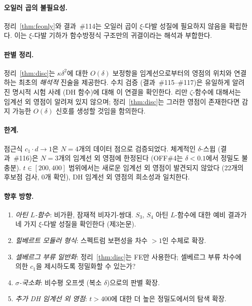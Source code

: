 \documentclass[11pt, a4paper]{article}
\theoremstyle{plain}
\theoremstyle{definition}
\begin{document}
\paragraph{오일러 곱의 불필요성.}
정리~\ref{thm:feonly}와 결과~\#114는 오일러 곱이
$\xi$-다발 성질에 필요하지 않음을 확립한다.
이는 $\xi$-다발 기하가 함수방정식 구조만의 귀결이라는
해석과 부합한다.

\paragraph{판별 정리.}
정리~\ref{thm:disc}는 $\kappa\delta^{2}$에 대한
$O(\delta)$ 보정항을 임계선으로부터의 영점의 위치와
연결하는 최초의 \emph{해석적} 진술을 제공한다.
수치 검증 (결과~\#115--\#117)은 유일하게 알려진 명시적 시험 사례
(DH 함수)에 대해 이 연결을 확인한다.
리만 $\zeta$-함수에 대해서는 임계선 외 영점이 알려져 있지 않으며;
정리~\ref{thm:disc}는 그러한 영점이 존재한다면
감지 가능한 $O(\delta)$ 신호를 생성할 것임을 함의한다.

\paragraph{한계.}
점근식 $c_{1}\cdot d \to 1$은 $N=4$개의 데이터 점으로 검증되었다.
체계적인 $\delta$-스윕 (결과~\#116)은
$N=3$개의 임계선 외 영점에 한정된다
(OFF\#4는 $\delta<0.1$에서 정밀도 불충분).
$t\in[200,400]$ 범위에서는 새로운 임계선 외 영점이
발견되지 않았다 (22개의 후보점 검사, 0개 확인),
DH 임계선 외 영점의 희소성과 일치한다.

\paragraph{향후 방향.}
\begin{enumerate}
  \item \textit{아틴 $L$-함수}: 비가환, 잠재적 비자기-쌍대.
        $S_3$, $S_4$ 아틴 $L$-함수에 대한 예비 결과가
        네 가지 $\xi$-다발 성질을 확인한다 (제3논문).
  \item \textit{힐베르트 모듈러 형식}: 스펙트럼 보편성을 차수 $>1$인 수체로 확장.
  \item \textit{셀베르그 부류 일반화}: 정리~\ref{thm:disc}는
        FE만 사용한다; 셀베르그 부류 차수에 의한 $c_{1}$을
        제시하도록 정밀화할 수 있는가?
  \item \textit{$\sigma$-국소화}: 비수평 오프셋
        (복소 $\delta$)으로의 판별 확장.
  \item \textit{추가 DH 임계선 외 영점}: $t>400$에 대한
        더 높은 정밀도에서의 탐색 확장.
\end{enumerate}
\end{document}

